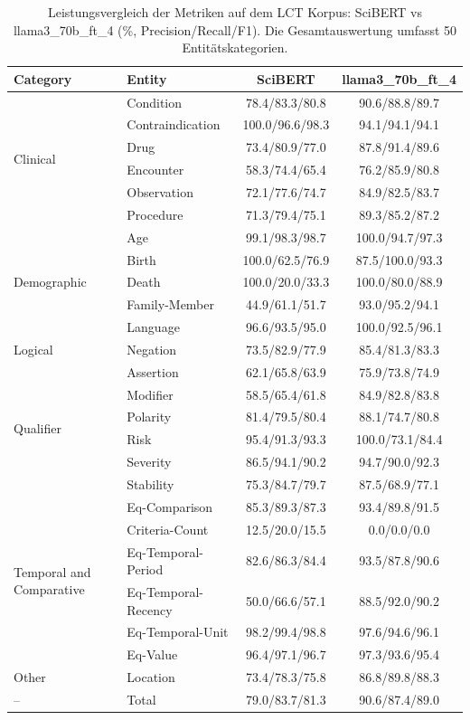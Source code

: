 
\begin{table}[htbp]
\centering
\begin{tabular}{llcc}
\toprule
\textbf{Category} & \textbf{Entity} & \textbf{SciBERT} & \textbf{llama3_70b_ft_4} \\
\midrule
\multirow{6}{*}{Clinical} & Condition & 78.4/83.3/80.8 & 90.6/88.8/89.7 \\
 & Contraindication & 100.0/96.6/98.3 & 94.1/94.1/94.1 \\
 & Drug & 73.4/80.9/77.0 & 87.8/91.4/89.6 \\
 & Encounter & 58.3/74.4/65.4 & 76.2/85.9/80.8 \\
 & Observation & 72.1/77.6/74.7 & 84.9/82.5/83.7 \\
 & Procedure & 71.3/79.4/75.1 & 89.3/85.2/87.2 \\
\midrule
\multirow{5}{*}{Demographic} & Age & 99.1/98.3/98.7 & 100.0/94.7/97.3 \\
 & Birth & 100.0/62.5/76.9 & 87.5/100.0/93.3 \\
 & Death & 100.0/20.0/33.3 & 100.0/80.0/88.9 \\
 & Family-Member & 44.9/61.1/51.7 & 93.0/95.2/94.1 \\
 & Language & 96.6/93.5/95.0 & 100.0/92.5/96.1 \\
\midrule
Logical & Negation & 73.5/82.9/77.9 & 85.4/81.3/83.3 \\
\midrule
\multirow{6}{*}{Qualifier} & Assertion & 62.1/65.8/63.9 & 75.9/73.8/74.9 \\
 & Modifier & 58.5/65.4/61.8 & 84.9/82.8/83.8 \\
 & Polarity & 81.4/79.5/80.4 & 88.1/74.7/80.8 \\
 & Risk & 95.4/91.3/93.3 & 100.0/73.1/84.4 \\
 & Severity & 86.5/94.1/90.2 & 94.7/90.0/92.3 \\
 & Stability & 75.3/84.7/79.7 & 87.5/68.9/77.1 \\
\midrule
\multirow{6}{*}{Temporal and Comparative} & Eq-Comparison & 85.3/89.3/87.3 & 93.4/89.8/91.5 \\
 & Criteria-Count & 12.5/20.0/15.5 & 0.0/0.0/0.0 \\
 & Eq-Temporal-Period & 82.6/86.3/84.4 & 93.5/87.8/90.6 \\
 & Eq-Temporal-Recency & 50.0/66.6/57.1 & 88.5/92.0/90.2 \\
 & Eq-Temporal-Unit & 98.2/99.4/98.8 & 97.6/94.6/96.1 \\
 & Eq-Value & 96.4/97.1/96.7 & 97.3/93.6/95.4 \\
\midrule
Other & Location & 73.4/78.3/75.8 & 86.8/89.8/88.3 \\
\midrule
-- & Total & 79.0/83.7/81.3 & 90.6/87.4/89.0 \\
\bottomrule
\end{tabular}
\caption{Leistungsvergleich der Metriken auf dem LCT Korpus: SciBERT vs llama3_70b_ft_4 (\%, Precision/Recall/F1). Die Gesamtauswertung umfasst 50 Entitätskategorien.}
\label{tab:metrics_comparison}
\end{table}
    